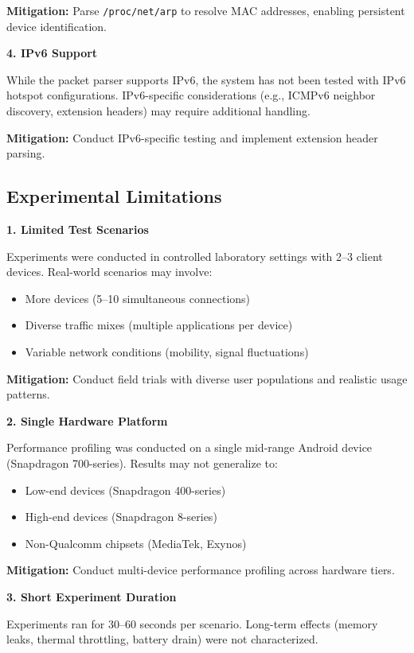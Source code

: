 \textbf{Mitigation:} Parse \texttt{/proc/net/arp} to resolve MAC addresses, enabling persistent device identification.

\textbf{4. IPv6 Support}

While the packet parser supports IPv6, the system has not been tested with IPv6 hotspot configurations. IPv6-specific considerations (e.g., ICMPv6 neighbor discovery, extension headers) may require additional handling.

\textbf{Mitigation:} Conduct IPv6-specific testing and implement extension header parsing.

\subsection{Experimental Limitations}

\textbf{1. Limited Test Scenarios}

Experiments were conducted in controlled laboratory settings with 2–3 client devices. Real-world scenarios may involve:
\begin{itemize}
    \item More devices (5–10 simultaneous connections)
    \item Diverse traffic mixes (multiple applications per device)
    \item Variable network conditions (mobility, signal fluctuations)
\end{itemize}

\textbf{Mitigation:} Conduct field trials with diverse user populations and realistic usage patterns.

\textbf{2. Single Hardware Platform}

Performance profiling was conducted on a single mid-range Android device (Snapdragon 700-series). Results may not generalize to:
\begin{itemize}
    \item Low-end devices (Snapdragon 400-series)
    \item High-end devices (Snapdragon 8-series)
    \item Non-Qualcomm chipsets (MediaTek, Exynos)
\end{itemize}

\textbf{Mitigation:} Conduct multi-device performance profiling across hardware tiers.

\textbf{3. Short Experiment Duration}

Experiments ran for 30–60 seconds per scenario. Long-term effects (memory leaks, thermal throttling, battery drain) were not characterized.


